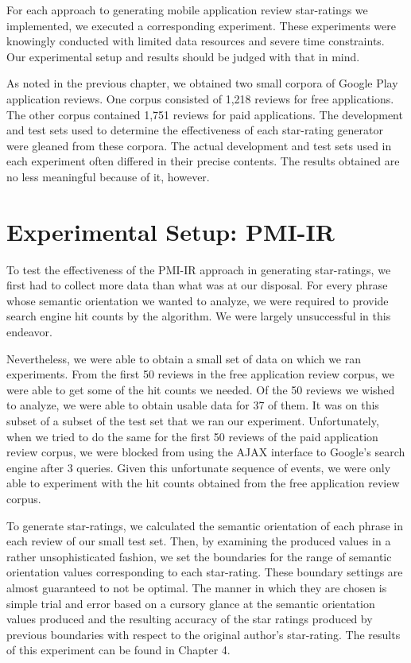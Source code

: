 \documentclass[11pt]{report} %
\begin{document}
For each approach to generating mobile application review star-ratings we implemented, we executed a corresponding experiment. These experiments were knowingly conducted with limited data resources and severe time constraints. Our experimental setup and results should be judged with that in mind. 

As noted in the previous chapter, we obtained two small corpora of Google Play application reviews. One corpus consisted of 1,218 reviews for free applications. The other corpus contained 1,751 reviews for paid applications. The development and test sets used to determine the effectiveness of each star-rating generator were gleaned from these corpora. The actual development and test sets used in each experiment often differed in their precise contents. The results obtained are no less meaningful because of it, however.

\section{Experimental Setup: PMI-IR}

To test the effectiveness of the PMI-IR approach in generating star-ratings, we first had to collect more data than what was at our disposal. For every phrase whose semantic orientation we wanted to analyze, we were required to provide search engine hit counts by the algorithm. We were largely unsuccessful in this endeavor. 

Nevertheless, we were able to obtain a small set of data on which we ran experiments. From the first 50 reviews in the free application review corpus, we were able to get some of the hit counts we needed. Of the 50 reviews we wished to analyze, we were able to obtain usable data for 37 of them. It was on this subset of a subset of the test set that we ran our experiment. Unfortunately, when we tried to do the same for the first 50 reviews of the paid application review corpus, we were blocked from using the AJAX interface to Google's search engine after 3 queries. Given this unfortunate sequence of events, we were only able to experiment with the hit counts obtained from the free application review corpus.

To generate star-ratings, we calculated the semantic orientation of each phrase in each review of our small test set. Then, by examining the produced values in a rather unsophisticated fashion, we set the boundaries for the range of semantic orientation values corresponding to each star-rating. These boundary settings are almost guaranteed to not be optimal. The manner in which they are chosen is simple trial and error based on a cursory glance at the semantic orientation values produced and the resulting accuracy of the star ratings produced by previous boundaries with respect to the original author's star-rating. The results of this experiment can be found in Chapter 4.
\end{document}
